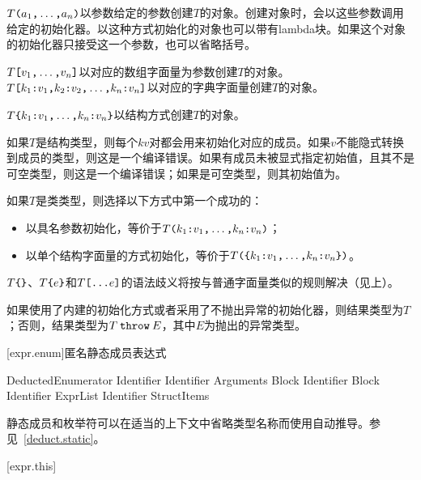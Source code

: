 \pnum
$T\texttt{(}a_1\texttt{,}\ldots\texttt{,}a_n\texttt{)}$以参数给定的参数创建$T$的对象。创建对象时，会以这些参数调用给定的初始化器。以这种方式初始化的对象也可以带有lambda块。如果这个对象的初始化器只接受这一个参数，也可以省略括号。

\pnum
$T\texttt{[}v_1\texttt{,}\ldots\texttt{,}v_n\texttt{]}$以对应的数组字面量为参数创建$T$的对象。
$T\texttt{[}k_1\texttt{:} v_1\texttt{,} k_2\texttt{:} v_2\texttt{,} \ldots\texttt{,} k_n\texttt{:} v_n\texttt{]}$以对应的字典字面量创建$T$的对象。

\pnum
$T\texttt{\{}k_1\texttt{:}v_1\texttt{,}\ldots\texttt{,}k_n\texttt{:}v_n\texttt{\}}$以结构方式创建$T$的对象。

\pnum
如果$T$是结构类型，则每个$kv$对都会用来初始化对应的成员。如果$v$不能隐式转换到成员的类型，则这是一个编译错误。如果有成员未被显式指定初始值，且其不是可空类型，则这是一个编译错误；如果是可空类型，则其初始值为。

\pnum
如果$T$是类类型，则选择以下方式中第一个成功的：

\begin{itemize}
    \item 以具名参数初始化，等价于$T\texttt{(}k_1\texttt{:}v_1\texttt{,}\ldots\texttt{,}k_n\texttt{:}v_n\texttt{)}$；
    \item 以单个结构字面量的方式初始化，等价于$T\texttt{(\{}k_1\texttt{:}v_1\texttt{,}\ldots\texttt{,}k_n\texttt{:}v_n\texttt{\})}$。
\end{itemize}

\pnum
$T\texttt{\{\}}$、$T\texttt{\{}e\texttt{\}}$和$T\texttt{[...}e\texttt{]}$的语法歧义将按与普通字面量类似的规则解决（见上）。

\pnum
如果使用了内建的初始化方式或者采用了不抛出异常的初始化器，则结果类型为$T$；否则，结果类型为$T\mathbin{\texttt{throw}}E$，其中$E$为抛出的异常类型。

[expr.enum]{匿名静态成员表达式}

\begin{bnf}{DeductedEnumerator}
     Identifier \br
     Identifier \terminal{(} Arguments\bnfq \terminal{)} Block\bnfs \br
     Identifier Block \br
     Identifier \terminal{[} ExprList\bnfq \terminal{]} \br
     Identifier \terminal{\{} StructItems\bnfq \terminal{\}}
\end{bnf}

\pnum
静态成员和枚举符可以在适当的上下文中省略类型名称而使用自动推导。参见~\ref{deduct.static}。

[expr.this]{}

